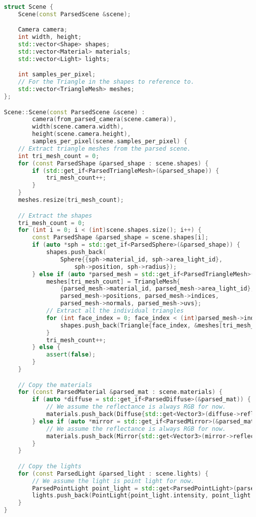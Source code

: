 \begin{lstlisting}[language=C++]
struct Scene {
    Scene(const ParsedScene &scene);

    Camera camera;
    int width, height;
    std::vector<Shape> shapes;
    std::vector<Material> materials;
    std::vector<Light> lights;

    int samples_per_pixel;
    // For the Triangle in the shapes to reference to.
    std::vector<TriangleMesh> meshes;
};

Scene::Scene(const ParsedScene &scene) :
        camera(from_parsed_camera(scene.camera)),
        width(scene.camera.width),
        height(scene.camera.height),
        samples_per_pixel(scene.samples_per_pixel) {
    // Extract triangle meshes from the parsed scene.
    int tri_mesh_count = 0;
    for (const ParsedShape &parsed_shape : scene.shapes) {
        if (std::get_if<ParsedTriangleMesh>(&parsed_shape)) {
            tri_mesh_count++;
        }
    }
    meshes.resize(tri_mesh_count);

    // Extract the shapes
    tri_mesh_count = 0;
    for (int i = 0; i < (int)scene.shapes.size(); i++) {
        const ParsedShape &parsed_shape = scene.shapes[i];
        if (auto *sph = std::get_if<ParsedSphere>(&parsed_shape)) {
            shapes.push_back(
                Sphere{{sph->material_id, sph->area_light_id},
                    sph->position, sph->radius});
        } else if (auto *parsed_mesh = std::get_if<ParsedTriangleMesh>(&parsed_shape)) {
            meshes[tri_mesh_count] = TriangleMesh{
                {parsed_mesh->material_id, parsed_mesh->area_light_id},
                parsed_mesh->positions, parsed_mesh->indices,
                parsed_mesh->normals, parsed_mesh->uvs};
            // Extract all the individual triangles
            for (int face_index = 0; face_index < (int)parsed_mesh->indices.size(); face_index++) {
                shapes.push_back(Triangle{face_index, &meshes[tri_mesh_count]});
            }
            tri_mesh_count++;
        } else {
            assert(false);
        }
    }

    // Copy the materials
    for (const ParsedMaterial &parsed_mat : scene.materials) {
        if (auto *diffuse = std::get_if<ParsedDiffuse>(&parsed_mat)) {
            // We assume the reflectance is always RGB for now.
            materials.push_back(Diffuse{std::get<Vector3>(diffuse->reflectance)});
        } else if (auto *mirror = std::get_if<ParsedMirror>(&parsed_mat)) {
            // We assume the reflectance is always RGB for now.
            materials.push_back(Mirror{std::get<Vector3>(mirror->reflectance)});
        }
    }

    // Copy the lights
    for (const ParsedLight &parsed_light : scene.lights) {
        // We assume the light is point light for now.
        ParsedPointLight point_light = std::get<ParsedPointLight>(parsed_light);
        lights.push_back(PointLight{point_light.intensity, point_light.position});
    }
}
\end{lstlisting}
